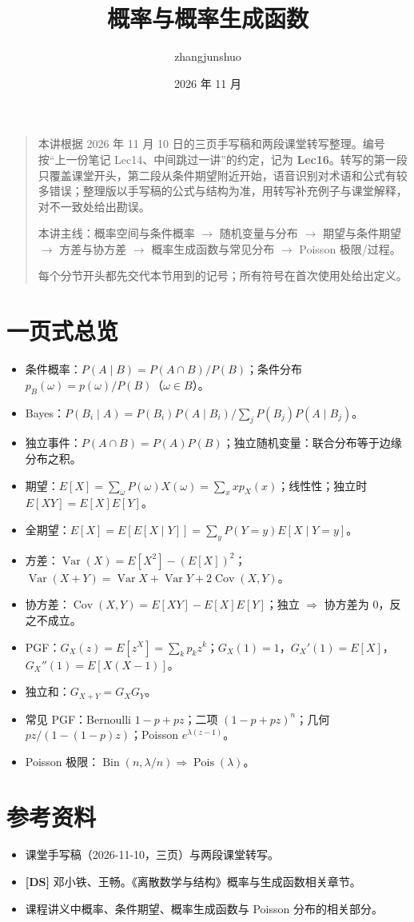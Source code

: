 \documentclass[UTF8,a4paper,11pt]{ctexart}
\title{概率与概率生成函数}\author{zhangjunshuo}\date{2026 年 11 月}
\begin{document}
\maketitle
\begin{quote}
本讲根据 2026 年 11 月 10 日的三页手写稿和两段课堂转写整理。编号按“上一份笔记 Lec14、中间跳过一讲”的约定，记为 \textbf{Lec16}。转写的第一段只覆盖课堂开头，第二段从条件期望附近开始，语音识别对术语和公式有较多错误；整理版以手写稿的公式与结构为准，用转写补充例子与课堂解释，对不一致处给出勘误。

本讲主线：概率空间与条件概率 $\to$ 随机变量与分布 $\to$ 期望与条件期望 $\to$ 方差与协方差 $\to$ 概率生成函数与常见分布 $\to$ Poisson 极限/过程。

每个分节开头都先交代本节用到的记号；所有符号在首次使用处给出定义。
\end{quote}
\tableofcontents\clearpage






\section*{一页式总览}
\begin{itemize}
\item 条件概率：$P(A\mid B)=P(A\cap B)/P(B)$；条件分布 $p_B(\omega)=p(\omega)/P(B)$（$\omega\in B$）。
\item Bayes：$P(B_i\mid A)=P(B_i)P(A\mid B_i)/\sum_jP(B_j)P(A\mid B_j)$。
\item 独立事件：$P(A\cap B)=P(A)P(B)$；独立随机变量：联合分布等于边缘分布之积。
\item 期望：$E[X]=\sum_\omega P(\omega)X(\omega)=\sum_x x p_X(x)$；线性性；独立时 $E[XY]=E[X]E[Y]$。
\item 全期望：$E[X]=E[E[X\mid Y]]=\sum_yP(Y=y)E[X\mid Y=y]$。
\item 方差：$\operatorname{Var}(X)=E[X^2]-(E[X])^2$；$\operatorname{Var}(X+Y)=\operatorname{Var}X+\operatorname{Var}Y+2\operatorname{Cov}(X,Y)$。
\item 协方差：$\operatorname{Cov}(X,Y)=E[XY]-E[X]E[Y]$；独立 $\Rightarrow$ 协方差为 $0$，反之不成立。
\item PGF：$G_X(z)=E[z^X]=\sum_kp_kz^k$；$G_X(1)=1$，$G_X'(1)=E[X]$，$G_X''(1)=E[X(X-1)]$。
\item 独立和：$G_{X+Y}=G_XG_Y$。
\item 常见 PGF：Bernoulli $1-p+pz$；二项 $(1-p+pz)^n$；几何 $pz/(1-(1-p)z)$；Poisson $e^{\lambda(z-1)}$。
\item Poisson 极限：$\operatorname{Bin}(n,\lambda/n)\Rightarrow\operatorname{Pois}(\lambda)$。
\end{itemize}

\section*{参考资料}
\begin{itemize}
\item 课堂手写稿（2026-11-10，三页）与两段课堂转写。
\item \textbf{[DS]} 邓小铁、王畅。《离散数学与结构》概率与生成函数相关章节。
\item 课程讲义中概率、条件期望、概率生成函数与 Poisson 分布的相关部分。
\end{itemize}
\end{document}
